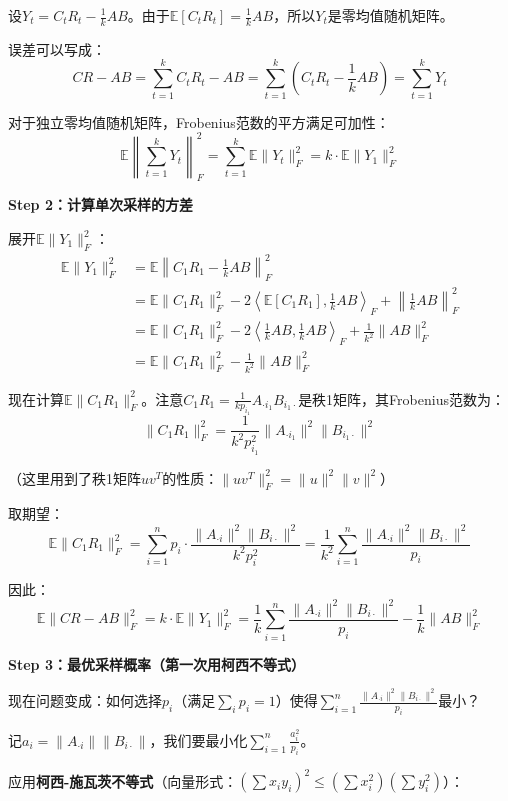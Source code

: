\documentclass[11pt,a4paper]{ctexart}
\theoremstyle{definition}
\theoremstyle{remark}
\begin{document}
设$Y_t = C_t R_t - \frac{1}{k}AB$。由于$\mathbb{E}[C_t R_t] = \frac{1}{k}AB$，所以$Y_t$是零均值随机矩阵。

误差可以写成：
\[
CR - AB = \sum_{t=1}^k C_t R_t - AB = \sum_{t=1}^k \left(C_t R_t - \frac{1}{k}AB\right) = \sum_{t=1}^k Y_t
\]

对于独立零均值随机矩阵，Frobenius范数的平方满足可加性：
\[
\mathbb{E}\left\|\sum_{t=1}^k Y_t\right\|_F^2 = \sum_{t=1}^k \mathbb{E}\|Y_t\|_F^2 = k \cdot \mathbb{E}\|Y_1\|_F^2
\]

\textbf{Step 2：计算单次采样的方差}

展开$\mathbb{E}\|Y_1\|_F^2$：
\begin{align*}
\mathbb{E}\|Y_1\|_F^2 &= \mathbb{E}\left\|C_1 R_1 - \frac{1}{k}AB\right\|_F^2 \\
&= \mathbb{E}\|C_1 R_1\|_F^2 - 2\left\langle \mathbb{E}[C_1 R_1], \frac{1}{k}AB \right\rangle_F + \left\|\frac{1}{k}AB\right\|_F^2 \\
&= \mathbb{E}\|C_1 R_1\|_F^2 - 2\left\langle \frac{1}{k}AB, \frac{1}{k}AB \right\rangle_F + \frac{1}{k^2}\|AB\|_F^2 \\
&= \mathbb{E}\|C_1 R_1\|_F^2 - \frac{1}{k^2}\|AB\|_F^2
\end{align*}

现在计算$\mathbb{E}\|C_1 R_1\|_F^2$。注意$C_1 R_1 = \frac{1}{kp_{i_1}} A_{\cdot i_1} B_{i_1\cdot}$是秩1矩阵，其Frobenius范数为：
\[
\|C_1 R_1\|_F^2 = \frac{1}{k^2 p_{i_1}^2} \|A_{\cdot i_1}\|^2 \|B_{i_1\cdot}\|^2
\]

（这里用到了秩1矩阵$uv^T$的性质：$\|uv^T\|_F^2 = \|u\|^2 \|v\|^2$）

取期望：
\[
\mathbb{E}\|C_1 R_1\|_F^2 = \sum_{i=1}^n p_i \cdot \frac{\|A_{\cdot i}\|^2 \|B_{i\cdot}\|^2}{k^2 p_i^2} = \frac{1}{k^2} \sum_{i=1}^n \frac{\|A_{\cdot i}\|^2 \|B_{i\cdot}\|^2}{p_i}
\]

因此：
\[
\mathbb{E}\|CR - AB\|_F^2 = k \cdot \mathbb{E}\|Y_1\|_F^2 = \frac{1}{k}\sum_{i=1}^n \frac{\|A_{\cdot i}\|^2 \|B_{i\cdot}\|^2}{p_i} - \frac{1}{k}\|AB\|_F^2
\]

\textbf{Step 3：最优采样概率（第一次用柯西不等式）}

现在问题变成：如何选择$p_i$（满足$\sum_i p_i = 1$）使得$\sum_{i=1}^n \frac{\|A_{\cdot i}\|^2 \|B_{i\cdot}\|^2}{p_i}$最小？

记$a_i = \|A_{\cdot i}\| \|B_{i\cdot}\|$，我们要最小化$\sum_{i=1}^n \frac{a_i^2}{p_i}$。

应用\textbf{柯西-施瓦茨不等式}（向量形式：$(\sum x_i y_i)^2 \leq (\sum x_i^2)(\sum y_i^2)$）：
\end{document}
